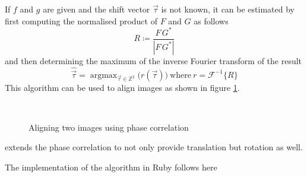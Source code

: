 \documentclass[a4paper,12pt]{book}
\begin{document}
If $f$ and $g$ are given and the shift vector $\vec{\tau}$ is not known,
it can be estimated by first computing the normalised product of $F$ and $G$ as
follows\cite{RefWorks:432}
\begin{equation*}
R\coloneqq\frac{F\,G^{*}}{|F\,G^{*}|}
\end{equation*}
and then determining the maximum of the inverse Fourier transform of the result
\begin{equation*}
  \widehat{\vec{\tau}}=\mathop{\mathrm{argmax}}_{\vec{\tau}\in\mathbb{Z}^2}\big(r(\vec{\tau})\big)
  \mathrm{\ where\ }r=\mathcal{F}^{-1}\{R\}
\end{equation*}
This algorithm can be used to align images as shown in figure \ref{fig:phasecorrelation}.
\begin{figure}[htbp]
   \begin{center}
     \\
     \caption{Aligning two images using phase
       correlation\label{fig:phasecorrelation}}
   \end{center}
\end{figure}
\cite{RefWorks:432} extends the phase correlation to not only provide
translation but rotation as well. %

The implementation of the algorithm in Ruby follows here
\begin{scriptsize}
  
\end{scriptsize}
\end{document}
